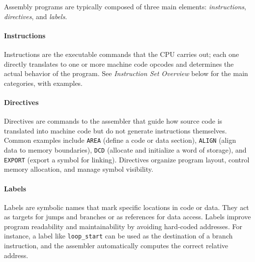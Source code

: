 Assembly programs are typically composed of three main elements: \emph{instructions}, \emph{directives}, and \emph{labels}.

\paragraph{Instructions}
Instructions are the executable commands that the CPU carries out; each one directly translates to one or more machine code opcodes and determines the actual behavior of the program. See \textit{Instruction Set Overview} below for the main categories, with examples.

\paragraph{Directives}  
Directives are commands to the assembler that guide how source code is translated into machine code but do not generate instructions themselves. Common examples include \texttt{AREA} (define a code or data section), \texttt{ALIGN} (align data to memory boundaries), \texttt{DCD} (allocate and initialize a word of storage), and \texttt{EXPORT} (export a symbol for linking). Directives organize program layout, control memory allocation, and manage symbol visibility.

\paragraph{Labels}  
Labels are symbolic names that mark specific locations in code or data. They act as targets for jumps and branches or as references for data access. Labels improve program readability and maintainability by avoiding hard-coded addresses. For instance, a label like \texttt{loop\_start} can be used as the destination of a branch instruction, and the assembler automatically computes the correct relative address.
